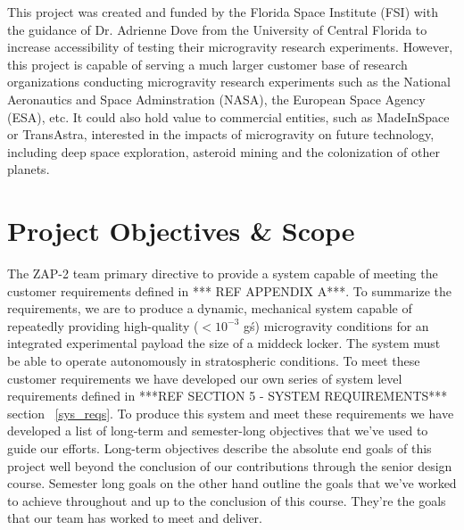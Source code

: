 This project was created and funded by the Florida Space Institute (FSI) with the guidance of Dr. Adrienne Dove from the University of Central Florida to increase accessibility of testing their microgravity research experiments. However, this project is capable of serving a much larger customer base of research organizations conducting microgravity research experiments such as the National Aeronautics and Space Adminstration (NASA), the European Space Agency (ESA), etc. It could also hold value to commercial entities, such as MadeInSpace or TransAstra, interested in the impacts of microgravity on future technology, including deep space exploration, asteroid mining and the colonization of other planets.


\section{Project Objectives \& Scope}

\indent\indent The ZAP-2 team primary directive to provide a system capable of meeting the customer requirements defined in *** REF APPENDIX A***. To summarize the requirements, we are to produce a dynamic, mechanical system capable of repeatedly providing high-quality ($< 10^{-3}$ g\'s) microgravity conditions for an integrated experimental payload the size of a middeck locker. The system must be able to operate autonomously in stratospheric conditions. To meet these customer requirements we have developed our own series of system level requirements defined in ***REF SECTION 5 - SYSTEM REQUIREMENTS*** section ~\ref{sys_reqs}. To produce this system and meet these requirements we have developed a list of long-term and semester-long objectives that we've used to guide our efforts. Long-term objectives describe the absolute end goals of this project well beyond the conclusion of our contributions through the senior design course. Semester long goals on the other hand outline the goals that we've worked to achieve throughout and up to the conclusion of this course. They're the goals that our team has worked to meet and deliver. 

